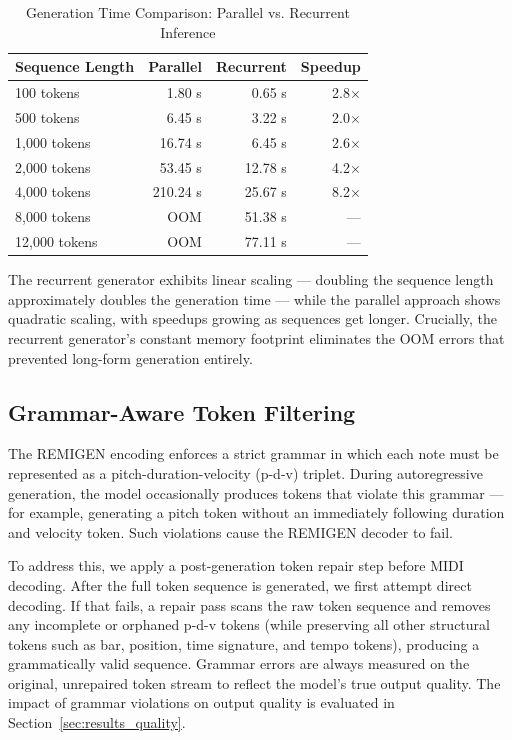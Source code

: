 \documentclass[conference]{IEEEtran}
\begin{document}
\begin{table}[htbp]
\centering
\caption{Generation Time Comparison: Parallel vs. Recurrent Inference}
\label{tab:inference_benchmark}
\begin{tabular}{lrrr}
\toprule
\textbf{Sequence Length} & \textbf{Parallel} & \textbf{Recurrent} & \textbf{Speedup} \\
\midrule
100 tokens   & 1.80 s  & 0.65 s  & 2.8$\times$ \\
500 tokens   & 6.45 s  & 3.22 s  & 2.0$\times$ \\
1,000 tokens & 16.74 s & 6.45 s  & 2.6$\times$ \\
2,000 tokens & 53.45 s & 12.78 s & 4.2$\times$ \\
4,000 tokens & 210.24 s   & 25.67 s & 8.2$\times$ \\
8,000 tokens & OOM     & 51.38 s & --- \\
12,000 tokens & OOM    & 77.11 s & --- \\
\bottomrule
\end{tabular}
\end{table}

The recurrent generator exhibits linear scaling --- doubling the sequence length approximately doubles the generation time --- while the parallel approach shows quadratic scaling, with speedups growing as sequences get longer. Crucially, the recurrent generator's constant memory footprint eliminates the OOM errors that prevented long-form generation entirely.


\subsection{Grammar-Aware Token Filtering}
\label{sec:grammar_filtering}

The REMIGEN encoding enforces a strict grammar in which each note must be represented as a pitch-duration-velocity (p-d-v) triplet. During autoregressive generation, the model occasionally produces tokens that violate this grammar --- for example, generating a pitch token without an immediately following duration and velocity token. Such violations cause the REMIGEN decoder to fail.

To address this, we apply a post-generation token repair step before MIDI decoding. After the full token sequence is generated, we first attempt direct decoding. If that fails, a repair pass scans the raw token sequence and removes any incomplete or orphaned p-d-v tokens (while preserving all other structural tokens such as bar, position, time signature, and tempo tokens), producing a grammatically valid sequence. Grammar errors are always measured on the original, unrepaired token stream to reflect the model's true output quality. The impact of grammar violations on output quality is evaluated in Section~\ref{sec:results_quality}.
\end{document}
